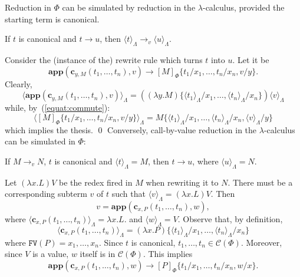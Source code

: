 \documentclass{LMCS}
\newcommand{\varone}{x}
\newcommand{\vartwo}{y}
\newcommand{\lambdaone}{M}
\newcommand{\lambdatwo}{N}
\newcommand{\lambdathree}{L}
\newcommand{\lambdafour}{P}
\newcommand{\valueone}{V}
\newcommand{\termone}{t}
\newcommand{\termtwo}{u}
\newcommand{\termthree}{v}
\newcommand{\termfour}{w}
\newcommand{\appTRS}{\mathbf{app}}
\newcommand{\constr}[2]{\mathbf{c}_{#1,#2}}
\newcommand{\LambdatoTRS}[1]{[#1]_{\Phi}}
\newcommand{\TRStolambda}[1]{\langle{#1}\rangle_{\Lambdaterms}}
\newcommand{\Lambdaterms}{\Lambda}
\newcommand{\TRS}{\Phi}
\newcommand{\TRSconterms}{\mathcal{C}(\Phi)}
\newcommand{\rewrTRS}{\rightarrow}
\newcommand{\rewrlambdav}{\rightarrow_v}
\newcommand{\FV}[1]{\mathtt{FV}(#1)}
\begin{document}
Reduction in $\TRS$ can be simulated by reduction in the $\lambda$-calculus,
provided the starting term is canonical.  
\begin{lem}\label{lemma:TRStolam}
If $\termone$ is canonical and $\termone\rewrTRS\termtwo$, then
$\TRStolambda{\termone}\rewrlambdav\TRStolambda{\termtwo}$.
\end{lem}
\proof
Consider the (instance of the) rewrite rule which
turns $\termone$ into $\termtwo$. Let it be
$$
\appTRS(\constr{\vartwo}{\lambdaone}(\termone_1,\ldots,\termone_n),\termthree)\rewrTRS
\LambdatoTRS{\lambdaone}\{\termone_1/\varone_1,\ldots,\termone_n/\varone_n,\termthree/\vartwo\}.
$$
Clearly,
$$
\TRStolambda{\appTRS(\constr{\vartwo}{\lambdaone}(\termone_1,\ldots,\termone_n),\termthree)}=
  ((\lambda\vartwo.\lambdaone)\{\TRStolambda{\termone_1}/\varone_1,\ldots,\TRStolambda{\termone_n}/\varone_n\})\TRStolambda{\termthree}
$$
while, by~(\ref{equat:commute}):
$$
\TRStolambda{\LambdatoTRS{\lambdaone}\{\termone_1/\varone_1,\ldots,\termone_n/\varone_n,\termthree/\vartwo\}}
=\lambdaone\{\TRStolambda{\termone_1}/\varone_1,\ldots,\TRStolambda{\termone_n}/\varone_n,\TRStolambda{\termthree}/\vartwo\}
$$
which implies the thesis.
\qed
Conversely, call-by-value reduction in the $\lambda$-calculus can be simulated in $\TRS$:
\begin{lem}\label{lemma:lamtoTRS}
If $\lambdaone\rewrlambdav\lambdatwo$, $\termone$ is canonical and $\TRStolambda{\termone}=\lambdaone$, then
$\termone\rewrTRS\termtwo$, where $\TRStolambda{\termtwo}=\lambdatwo$.
\end{lem}
\proof
Let $(\lambda\varone.\lambdathree)\valueone$ be the redex fired in $\lambdaone$ when rewriting
it to $\lambdatwo$. There must be a corresponding subterm $\termthree$ of $\termone$ such
that $\TRStolambda{\termthree}=(\lambda\varone.\lambdathree)\valueone$. Then
$$
\termthree=\appTRS(\constr{\varone}{\lambdafour}(\termone_1,\ldots,\termone_n),\termfour),
$$
where $\TRStolambda{\constr{\varone}{\lambdafour}(\termone_1,\ldots,\termone_n)}=\lambda\varone.\lambdathree$.
and $\TRStolambda{\termfour}=\valueone$. Observe that, by definition,
$$
\TRStolambda{\constr{\varone}{\lambdafour}(\termone_1,\ldots,\termone_n)}=
(\lambda\varone.\lambdafour)\{\TRStolambda{\termone_1}/\varone_1,\ldots,\TRStolambda{\termone_n}/\varone_n\}
$$
where $\FV{\lambdafour}=\varone_1,\ldots,\varone_n$. Since $\termone$ is canonical, 
$\termone_1,\ldots,\termone_n\in\TRSconterms$. Moreover, since $\valueone$ is a value,
$\termfour$ itself is in $\TRSconterms$. This implies
$$
\appTRS(\constr{\varone}{\lambdafour}(\termone_1,\ldots,\termone_n),\termfour)\rewrTRS
\LambdatoTRS{\lambdafour}\{\termone_1/\varone_1,\ldots,\termone_n/\varone_n,\termfour/\varone\}.
$$   
\end{document}
